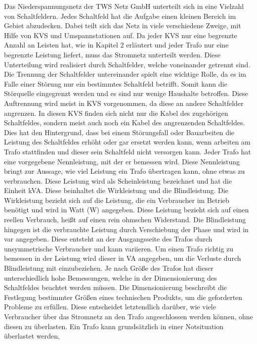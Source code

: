 Das Niederspannungsnetz der TWS Netz GmbH unterteilt sich in eine Vielzahl von Schaltfeldern. Jedes Schaltfeld hat die Aufgabe einen kleinen Bereich im Gebiet 
abzudecken. Dabei teilt sich das Netz in viele verschiedene Zweige, mit Hilfe von KVS und Umspannstationen auf. Da jeder KVS nur eine begrenzte Anzahl an 
Leisten hat, wie in Kapitel 2 erläutert und jeder Trafo nur eine begrenzte Leistung liefert, muss das Stromnetz unterteilt werden. Diese Unterteilung wird 
realisiert durch Schaltfelder, welche voneinander getrennt sind. Die Trennung der Schaltfelder untereinander spielt eine wichtige Rolle, da es im Falle 
einer Störung nur ein bestimmtes Schaltfeld betrifft. Somit kann die Störquelle eingegrenzt werden und es sind nur wenige Haushalte betroffen. Diese 
Auftrennung wird meist in KVS vorgenommen, da diese an andere Schaltfelder angrenzen. In diesen KVS finden sich nicht nur die Kabel des zugehörigen 
Schaltfeldes, sondern meist auch noch ein Kabel des angrenzenden Schaltfeldes. Dies hat den Hintergrund, dass bei einem Störungsfall oder Bauarbeiten die 
Leistung des Schaltfeldes erhöht oder gar ersetzt werden kann, wenn \zB arbeiten am Trafo stattfinden und dieser sein Schaltfeld nicht versorgen kann. 
Jeder Trafo hat eine vorgegebene Nennleistung, mit der er bemessen wird. Diese Nennleistung bringt zur Aussage, wie viel Leistung ein Trafo übertragen kann, 
ohne etwas zu verbrauchen. Diese Leistung wird als Scheinleistung bezeichnet und hat die Einheit kVA. Diese beinhaltet die Wirkleistung und die Blindleistung. 
Die Wirkleistung bezieht sich auf die Leistung, die ein Verbraucher im Betrieb benötigt und wird in Watt (W) angegeben. Diese Leistung bezieht sich auf 
einen reellen Verbrauch, heißt auf einen rein ohmschen Widerstand. Die Blindleistung hingegen ist die verbrauchte Leistung durch Verschiebung der Phase und 
wird in var angegeben. %
Diese entsteht an der Ausgangsseite des Trafos durch unsymmetrische Verbraucher und kann variieren. Um einen Trafo richtig zu
bemessen in der Leistung wird dieser in VA angegeben, um die Verluste durch Blindleistung mit einzubeziehen. Je nach Größe des Trafos hat dieser 
unterschiedlich hohe Bemessungen, welche in der Dimensionierung des Schaltfeldes beachtet werden müssen. Die Dimensionierung beschreibt die Festlegung 
bestimmter Größen eines technischen Produkts, um die geforderten Probleme zu erfüllen. Diese entscheidet letztendlich darüber, wie viele Verbraucher über 
das Stromnetz an den Trafo angeschlossen werden können, ohne diesen zu überlasten. Ein Trafo kann grundsätzlich in einer Notsituation überlastet werden, 
